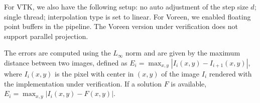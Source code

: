 For VTK, we also have the following setup: no auto adjustment of the step
size $d$; single thread; interpolation type is set to linear. 
For Voreen, we enabled floating
point buffers in the pipeline. The Voreen version under verification
does not support parallel projection.

The errors are computed using the $L_\infty$ norm and are given by the
maximum distance between two images, defined as $E_i = \max_{x,y} |
I_{i}(x,y) - I_{i+1}(x,y)|$, where $I_{i}(x,y)$ is the pixel with
center in $(x,y)$ of the image $I_i$ rendered with the implementation
under verification. If a solution $F$ is available, $E_i = \max_{x,y}
| I_{i}(x,y) - F(x,y)|$. 


